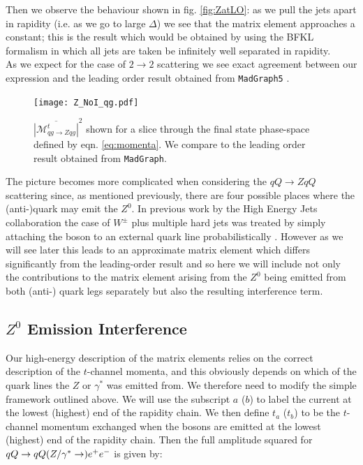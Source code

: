 		Then we observe the behaviour shown in fig. \eqref{fig:ZatLO}: as we pull the
		jets apart in rapidity (i.e. as we go to large $\Delta$) we see that the matrix element
		approaches a constant; this is the result which would be obtained by using the BFKL
		formalism in which all jets are taken be infinitely well separated in rapidity.\\As we
		expect for the case of $2\to 2$ scattering we see exact agreement between our expression
		and the leading order result obtained from \texttt{MadGraph5} \cite{Alwall:2014hca}.

		\begin{figure}[hbt]
			\centering
			\texttt{[image: Z\_NoI\_qg.pdf]}
			\caption{$\overline{|\mathcal{M}_{qg\to Zqg}^{t}|}^2$ shown for a slice through the
			final state phase-space defined by eqn. \eqref{eq:momenta}.  We compare to the
			leading order result obtained from \texttt{MadGraph}.}
			\label{fig:ZatLO}
		\end{figure}

		The picture becomes more complicated when considering the $qQ\to ZqQ$ scattering since,
		as mentioned previously, there are four possible places where the (anti-)quark may emit
		the $Z^0$.  In previous work by the High Energy Jets collaboration the case of
		$W^\pm$ plus multiple hard jets was treated by simply attaching the boson to an external
		quark line probabilistically \cite{Andersen:2012gk}.  However as we will see later this
		leads to an approximate matrix element which differs significantly from the leading-order
		result and so here we will include not only the contributions to the matrix element arising
		from the $Z^0$ being emitted from both (anti-) quark legs separately but also the resulting
		interference term.

	\subsection{$Z^0$ Emission Interference}

		Our high-energy
		description of the matrix elements relies on the correct description of the
		$t$-channel momenta, and this obviously depends on which of the quark lines
		the $Z$ or $\gamma^*$ was emitted from.  We therefore need to modify the simple
		framework outlined above.  We will use the subscript $a$ ($b$) to label the
		current at the lowest (highest) end of the rapidity chain.  We then define $t_a$
		($t_b$) to be the $t$-channel momentum exchanged when the bosons are emitted at
		the lowest (highest) end of the rapidity chain.  Then the full amplitude squared
		for $qQ\to qQ(Z/\gamma^*\to) e^+ e^-$ is given by:

